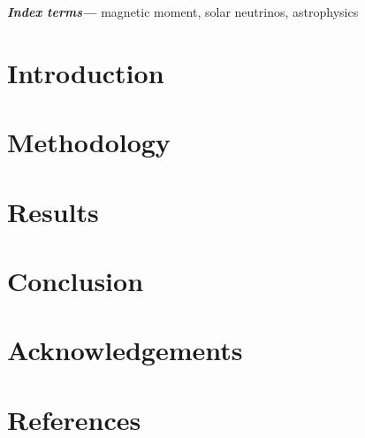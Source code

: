 \documentclass[12pt]{iopart}
\providecommand{\keywords}[1]{\textbf{\textit{Index terms---}} #1}
\begin{document}
\keywords{magnetic moment, solar neutrinos, astrophysics}
\submitto{\jpg}
\maketitle



\section{Introduction}
\label{sec:introduction}


\section{Methodology}
\label{sec:methodoglogy}


\section{Results}
\label{sec:results}


\section{Conclusion}
\label{sec:conclusion}




\section{Acknowledgements}
\label{sec:acknowledgements}


\section{References}
\label{sec:references}


\end{document}
